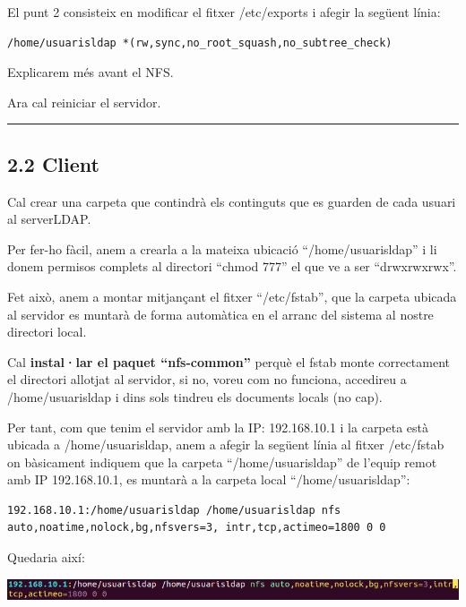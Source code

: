 \documentclass[
  12 pt,
  a4paper,
]{article}
\begin{document}
El punt 2 consisteix en modificar el fitxer /etc/exports i afegir la
següent línia:

\begin{verbatim}
/home/usuarisldap *(rw,sync,no_root_squash,no_subtree_check) 
\end{verbatim}

Explicarem més avant el NFS.

Ara cal reiniciar el servidor.

\begin{center}\rule{0.5\linewidth}{0.5pt}\end{center}

\subsection{2.2 Client}\label{client}

Cal crear una carpeta que contindrà els continguts que es guarden de
cada usuari al serverLDAP.

Per fer-ho fàcil, anem a crearla a la mateixa ubicació
``/home/usuarisldap'' i li donem permisos complets al directori ``chmod
777'' el que ve a ser ``drwxrwxrwx''.

Fet això, anem a montar mitjançant el fitxer ``/etc/fstab'', que la
carpeta ubicada al servidor es muntarà de forma automàtica en el arranc
del sistema al nostre directori local.

Cal \textbf{instal·lar el paquet ``nfs-common''} perquè el fstab monte
correctament el directori allotjat al servidor, si no, voreu com no
funciona, accedireu a /home/usuarisldap i dins sols tindreu els
documents locals (no cap).

Per tant, com que tenim el servidor amb la IP: 192.168.10.1 i la carpeta
està ubicada a /home/usuarisldap, anem a afegir la següent línia al
fitxer /etc/fstab on bàsicament indiquem que la carpeta
``/home/usuarisldap'' de l'equip remot amb IP 192.168.10.1, es muntarà a
la carpeta local ``/home/usuarisldap'':

\begin{verbatim}
192.168.10.1:/home/usuarisldap /home/usuarisldap nfs auto,noatime,nolock,bg,nfsvers=3, intr,tcp,actimeo=1800 0 0
\end{verbatim}

Quedaria així:

\includegraphics{png/perfilmobil1.png}
\end{document}
